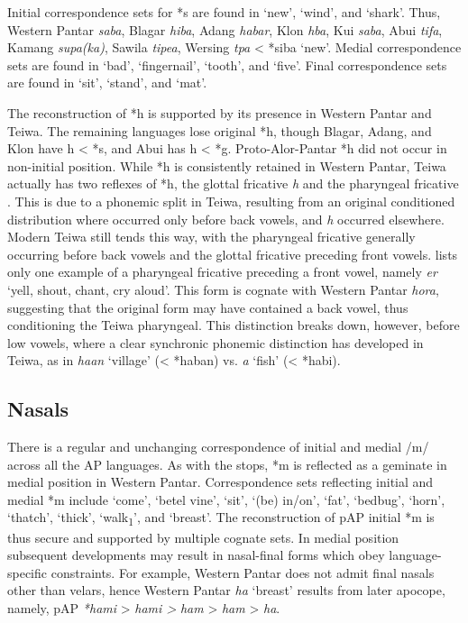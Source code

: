 Initial correspondence sets for *s are found in `new', `wind', and `shark'. Thus, Western Pantar \textit{sab{\textlengthmark}a}, Blagar \textit{ hiba}, Adang \textit{habar}, Klon \textit{h{\textschwa}ba}, Kui \textit{saba}, Abui \textit{tifa}, Kamang \textit{supa(ka)}, Sawila \textit{tipea}, Wersing \textit{t{\textschwa}pa }{\textless} *siba `new'. Medial correspondence sets are found in `bad', `fingernail', `tooth', and `five'. Final correspondence sets are found in `sit', `stand', and `mat'. 

The reconstruction of *h is supported by its presence in Western Pantar and Teiwa. The remaining languages lose original *h, though Blagar, Adang, and Klon have h {\textless} *s, and Abui has h {\textless} *g. Proto-Alor-Pantar *h did not occur in non-initial position. While *h is consistently retained in Western Pantar, Teiwa actually has two reflexes of *h, the glottal fricative \textit{h} and the pharyngeal fricative \textit{{\pharfric}}. This is due to a phonemic split in Teiwa, resulting from an original conditioned distribution where \textit{{\pharfric}} occurred only before back vowels, and \textit{h} occurred elsewhere. Modern Teiwa still tends this way, with the pharyngeal fricative generally occurring before back vowels and the glottal fricative preceding front vowels. \citet{Klamer2010grammar} lists only one example of a pharyngeal fricative preceding a front vowel, namely \textit{{\pharfric}er} `yell, shout, chant, cry aloud'. This form is cognate with Western Pantar \textit{hora{\ng}}, suggesting that the original 
form may have contained a back vowel, thus conditioning the Teiwa pharyngeal. This distinction breaks down, however, before low vowels, where a clear synchronic phonemic distinction has developed in Teiwa, as in \textit{ha{\textphi}an }`village' ({\textless} *haban) vs. \textit{{\pharfric}a{\textphi} }`fish' ({\textless} *habi). 

\subsection{ Nasals}
There is a regular and unchanging correspondence of initial and medial /m/ across all the AP languages. As with the stops, *m is reflected as a geminate in medial position in Western Pantar. Correspondence sets reflecting initial and medial *m include `come', `betel vine', `sit', `(be) in/on', `fat', `bedbug', `horn', `thatch', `thick', `walk\textsubscript{1}', and `breast'. The reconstruction of pAP initial *m is thus secure and supported by multiple cognate sets. In medial position subsequent developments may result in nasal-final forms which obey language-specific constraints. For example, Western Pantar does not admit final nasals other than velars, hence Western Pantar \textit{ha{\ng} }`breast' results from later apocope, namely, pAP \textit{*hami} {\textgreater} \textit{ham{\textlengthmark}i {\textgreater}} \textit{ham{\textlengthmark}} {\textgreater} \textit{ham} {\textgreater} \textit{ha}\textit{{\ng}}.

